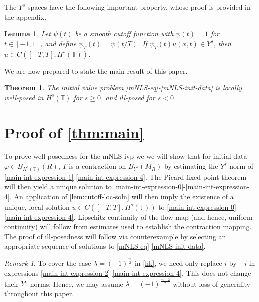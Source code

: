 \documentclass[12pt,reqno]{amsart}
\numberwithin{equation}{section}  %
\numberwithin{figure}{section}
\newcommand{\ci}{\mathbb{T}}
\newcommand{\vp}{\varphi}
\theoremstyle{plain}
\newtheorem{theorem}{Theorem}
\newtheorem{lemma}{Lemma}
\theoremstyle{definition}
\theoremstyle{remark}
\newtheorem{remark}{Remark}
\begin{document}
%
The $Y^s$ spaces have the following important property, whose proof
is provided in the appendix.
\begin{lemma}
	\label{lem:cutoff-loc-soln}
	Let $\psi(t)$ be a smooth cutoff function with $\psi(t) =1$ for $t \in [-1,
  1]$, and define $\psi_{T}(t) = \psi(t/T)$. If
  $\psi_{T}(t)u(x,t) \in Y^s$, then $u \in C([-T, T], H^s(\ci))$.
\end{lemma}

We are now prepared to state the main result of this paper.
%
%
%
%
%
%
%
%
%
%
\begin{theorem}
\label{thm:main}
The initial value problem 
\eqref{mNLS-eq}-\eqref{mNLS-init-data} is locally well-posed in $H^s(\ci)$ for $s \ge
0$, and ill-posed for $s <0$. %
%
\end{theorem} 
%
%
%
%
%
%
%
%
%
%
%
%
\section{Proof of \autoref{thm:main}}
%
%
To prove well-posedness for the mNLS ivp we we will 
show that for initial data $\vp \in B_{H^{s}(\ci)}(R)$, $T$ is a contraction on
$B_{Y^{s}}(M_{R})$ by estimating the $Y^s$
norm of \eqref{main-int-expression-1}-\eqref{main-int-expression-4}. The 
Picard fixed point theorem will
then yield a unique solution to
\eqref{main-int-expression-0}-\eqref{main-int-expression-4}. An application of
\autoref{lem:cutoff-loc-soln} will then imply the existence of a unique, local
solution $u \in C([-T, T], H^s(\ci))$ to
\eqref{main-int-expression-0}-\eqref{main-int-expression-4}.
Lipschitz continuity of the flow map (and hence, uniform
continuity) will follow from estimates used to establish the contraction
mapping. The proof of ill-posedness will follow via counterexample 
by selecting an appropriate sequence of
solutions to \eqref{mNLS-eq}-\eqref{mNLS-init-data}. 
%
\begin{framed}
\begin{remark}
  To cover the case $\lambda = (-1)^{\frac{m}{2}}$ in \eqref{hk}, we need only
  replace $i$ by $-i$ in
  expressions \eqref{main-int-expression-2}-\eqref{main-int-expression-4}. This
  does not change their $Y^s$ norms. Hence, we may assume $\lambda =
  (-1)^{\frac{m+2}{2}}$ without loss of generality throughout this paper.
\label{rem:lambda-arb}
\end{remark}
\end{framed}
\end{document}
